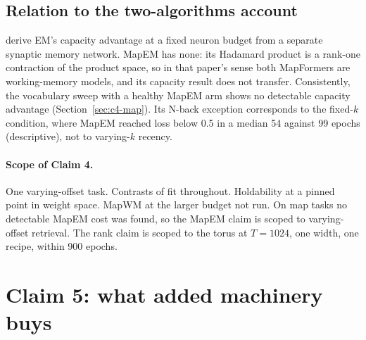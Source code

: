 \documentclass[10pt]{article}
\begin{document}
\subsection{Relation to the two-algorithms account}
\label{sec:c4-tale}

\citet{whittington2025tale} derive EM's capacity advantage at a fixed neuron budget from a separate
synaptic memory network. MapEM has none: its Hadamard product is a rank-one contraction of the product
space, so in that paper's sense both MapFormers are working-memory models, and its capacity result does
not transfer. Consistently, the vocabulary sweep with a healthy MapEM arm shows no detectable capacity advantage
(Section~\ref{sec:c4-map}). Its N-back exception corresponds to the fixed-$k$ condition, where MapEM
reached loss below 0.5 in a median 54 against 99 epochs (descriptive), not to varying-$k$ recency. %

\paragraph{Scope of Claim 4.} One varying-offset task. Contrasts of fit throughout. Holdability at a pinned
point in weight space. MapWM at the larger budget not run. On map tasks no detectable MapEM cost was found,
so the MapEM claim is scoped to varying-offset retrieval. The rank claim is scoped to the torus at $T=1024$,
one width, one recipe, within 900 epochs.

\section{Claim 5: what added machinery buys}
\label{sec:claim5}
\end{document}
